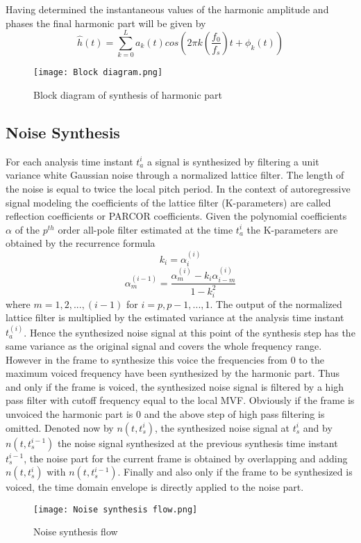\documentclass[BTech]{nitkdiss}
\begin{document}
Having determined the instantaneous values of the harmonic amplitude and phases the final harmonic part will be given by $$\hat{h}(t)=\sum_{k=0}^{L}a_{k}(t)cos(2\pi k(\dfrac{f_{0}}{f_{s}})t+\phi_{k}(t))$$

\begin{figure}[H]
\centering
\texttt{[image: Block diagram.png]}
\caption{Block diagram of synthesis of harmonic part}
\end{figure}

\subsection{Noise Synthesis}
 For each analysis time instant $t_{a}^{i}$ a signal is synthesized by filtering a unit variance white Gaussian noise through a normalized lattice filter. The length of the noise is equal to twice the local pitch period. In the context of autoregressive signal modeling the coefficients of the lattice filter (K-parameters) are called reflection coefficients or PARCOR coefficients. Given the polynomial coefficients $\alpha$ of the $p^{th}$ order all-pole filter estimated at the time $t_{a}^{i}$ the K-parameters are obtained by the recurrence formula $$k_{i}=\alpha_{i}^{(i)}$$ $$\alpha_{m}^{(i-1)}=\dfrac{\alpha_{m}^{(i)}-k_{i}\alpha_{i-m}^{(i)}}{1-k_{i}^{2}}$$ where $m=1,2,...,(i-1)$ for $i=p,p-1,...,1$.
The output of the normalized lattice filter is multiplied by the estimated variance at the analysis time instant $t_{a}^{(i)}$. Hence the synthesized noise signal at this point of the synthesis step has the same variance as the original signal and covers the whole frequency range. However in the frame to synthesize this voice the frequencies from 0 to the maximum voiced frequency have been synthesized by the harmonic part. Thus and only if the frame is voiced, the synthesized noise signal is filtered by a high pass filter with cutoff frequency equal to the local MVF. Obviously if the frame is unvoiced the harmonic part is 0 and the above step of high pass filtering is omitted. Denoted now by $n(t,t_{s}^{i})$, the synthesized noise signal at $t_{s}^{i}$ and by $n(t,t_{s}^{i-1})$ the noise signal synthesized at the previous synthesis time instant  $t_{s}^{i-1}$, the noise part for the current frame is obtained by overlapping and adding $n(t,t_{s}^{i})$ with $n(t,t_{s}^{i-1})$. Finally and also only if the frame to be synthesized is voiced, the time domain envelope is directly applied to the noise part.

\begin{figure}[H]
\centering
\texttt{[image: Noise synthesis flow.png]}
\caption{Noise synthesis flow}
\end{figure}
\end{document}

